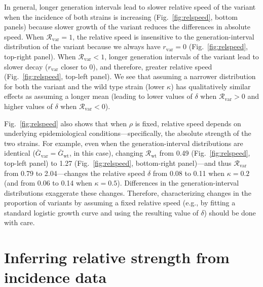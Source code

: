 \documentclass[12pt]{article}
\newcommand{\fref}[1]{Fig.~\ref{fig:#1}}
\newcommand{\vvvar}{\mathrm{var}}
\newcommand{\wwwt}{\mathrm{wt}}
\newcommand{\rx}[1]{\ensuremath{{r}_{#1}}\xspace}
\newcommand{\rv}{\rx{\vvvar}}
\newcommand{\Rx}[1]{\ensuremath{{\mathcal R}_{#1}}\xspace}
\newcommand{\Rw}{\Rx{\wwwt}}
\newcommand{\Rv}{\Rx{\vvvar}}
\newcommand{\Gx}[1]{\ensuremath{{\bar G}_{#1}}\xspace}
\newcommand{\Gw}{\Gx{\wwwt}}
\newcommand{\Gv}{\Gx{\vvvar}}
\begin{document}
In general, longer generation intervals lead to slower relative speed of the variant when the incidence of both strains is increasing (\fref{relspeed}, bottom panels) because slower growth of the variant reduces the differences in absolute speed.
When $\Rv=1$, the relative speed is insensitive to the generation-interval distribution of the variant because we always have $\rv=0$ (\fref{relspeed}, top-right panel).
When $\Rv<1$, longer generation intervals of the variant lead to slower decay ($\rv$ closer to 0), and therefore, greater relative speed (\fref{relspeed}, top-left panel).
We see that assuming a narrower distribution for both the variant and the wild type strain (lower $\kappa$) has qualitatively similar effects as assuming a longer mean (leading to lower values of $\delta$ when $\Rv > 0$ and higher values of $\delta$ when $\Rv < 0$).

\fref{relspeed} also shows that when $\rho$ is fixed, relative speed depends on underlying epidemiological conditions---specifically, the absolute strength of the two strains. 
For example, even when the generation-interval distributions are identical ($\Gv=\Gw$, in this case), changing $\Rw$ from 0.49 (\fref{relspeed}, top-left panel) to 1.27 (\fref{relspeed}, bottom-right panel)---and thus $\Rv$ from 0.79 to 2.04---changes the relative speed $\delta$ from 0.08 to 0.11 when $\kappa=0.2$ (and from 0.06 to 0.14 when $\kappa=0.5$).
Differences in the generation-interval distributions exaggerate these changes.
Therefore, characterizing changes in the proportion of variants by assuming a fixed relative speed (e.g., by fitting a standard logistic growth curve \citep{switzerland2021variant} and using the resulting value of $\delta$) should be done with care.

\section{Inferring relative strength from incidence data}
\end{document}
